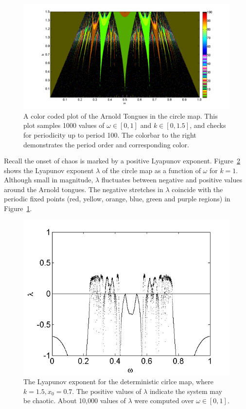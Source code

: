 \begin{figure}[!h]
\caption[The Arnold Tongues for the deterministic circle map]{A color coded
  plot of the Arnold Tongues in the circle map. This plot samples 1000 values of $\omega
  \in [0,1]$ and $k \in
  [0,1.5]$, and checks for periodicity up to period 100. The colorbar
  to the right demonstrates the period order and corresponding
  color.}\label{fig:dettongues}
	\begin{center}
		\includegraphics[scale=0.45]{figs/tongues_1000_det.png}
	\end{center}
\end{figure}
Recall the onset of chaos is marked by a positive Lyapunov
exponent. Figure~\ref{fig:detcirclyap} shows the Lyapunov exponent
$\lambda$ of
the circle map as a function of $\omega$ for $k=1$. Although small in
magnitude, $\lambda$ fluctuates between negative and positive
values around the Arnold tongues. The negative stretches in $\lambda$
coincide with the periodic fixed points (red, yellow, orange, blue, green
and purple regions) in
Figure~\ref{fig:dettongues}.  
\begin{figure}[!h]
\caption[Lyapunov exponent in the deterministic circle map]{The
  Lyapunov exponent for the deterministic
  cirlce map, where $k=1.5,x_0=0.7$. The positive values of $\lambda$
  indicate the system may be chaotic. About 10,000 values of $\lambda$
were computed over $\omega \in [0,1]$.}\label{fig:detcirclyap}
	\begin{center}
		\includegraphics[scale=0.65]{figs/det_circ_lyap.png}
	\end{center}
\end{figure} 
